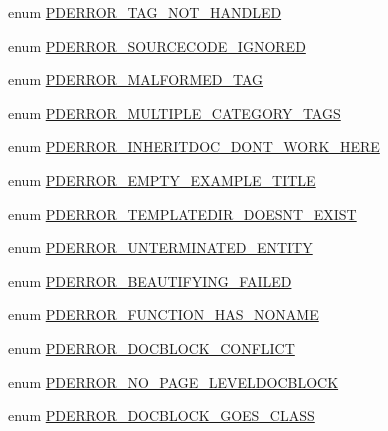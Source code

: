 \begin{DoxyCompactItemize}
enum \hyperlink{_errors_8inc_a3b7e6fcbb2eab91583bd30a67ca2931f}{\-P\-D\-E\-R\-R\-O\-R\-\_\-\-T\-A\-G\-\_\-\-N\-O\-T\-\_\-\-H\-A\-N\-D\-L\-E\-D} 
\item 
enum \hyperlink{_errors_8inc_abb488f51f018fe72379e3f6d28e18042}{\-P\-D\-E\-R\-R\-O\-R\-\_\-\-S\-O\-U\-R\-C\-E\-C\-O\-D\-E\-\_\-\-I\-G\-N\-O\-R\-E\-D} 
\item 
enum \hyperlink{_errors_8inc_a3c67c0681439a0421ce7b7a1a906c968}{\-P\-D\-E\-R\-R\-O\-R\-\_\-\-M\-A\-L\-F\-O\-R\-M\-E\-D\-\_\-\-T\-A\-G} 
\item 
enum \hyperlink{_errors_8inc_aabb34094599a840618a76d679885ed8f}{\-P\-D\-E\-R\-R\-O\-R\-\_\-\-M\-U\-L\-T\-I\-P\-L\-E\-\_\-\-C\-A\-T\-E\-G\-O\-R\-Y\-\_\-\-T\-A\-G\-S} 
\item 
enum \hyperlink{_errors_8inc_acc46229fbb1d0e6f217b4793f2e5982d}{\-P\-D\-E\-R\-R\-O\-R\-\_\-\-I\-N\-H\-E\-R\-I\-T\-D\-O\-C\-\_\-\-D\-O\-N\-T\-\_\-\-W\-O\-R\-K\-\_\-\-H\-E\-R\-E} 
\item 
enum \hyperlink{_errors_8inc_a18f0d64cdac99e18ba00e38f76f4975e}{\-P\-D\-E\-R\-R\-O\-R\-\_\-\-E\-M\-P\-T\-Y\-\_\-\-E\-X\-A\-M\-P\-L\-E\-\_\-\-T\-I\-T\-L\-E} 
\item 
enum \hyperlink{_errors_8inc_aa3ff15ba05df15070e53cddb0dd16285}{\-P\-D\-E\-R\-R\-O\-R\-\_\-\-T\-E\-M\-P\-L\-A\-T\-E\-D\-I\-R\-\_\-\-D\-O\-E\-S\-N\-T\-\_\-\-E\-X\-I\-S\-T} 
\item 
enum \hyperlink{_errors_8inc_ac1819edecbedcd7730959b8e0f501e00}{\-P\-D\-E\-R\-R\-O\-R\-\_\-\-U\-N\-T\-E\-R\-M\-I\-N\-A\-T\-E\-D\-\_\-\-E\-N\-T\-I\-T\-Y} 
\item 
enum \hyperlink{_errors_8inc_aacf0b9e2d6d73e79dbaa0189de75aa11}{\-P\-D\-E\-R\-R\-O\-R\-\_\-\-B\-E\-A\-U\-T\-I\-F\-Y\-I\-N\-G\-\_\-\-F\-A\-I\-L\-E\-D} 
\item 
enum \hyperlink{_errors_8inc_a27a928754d8422c41c5202ac2f06c3b9}{\-P\-D\-E\-R\-R\-O\-R\-\_\-\-F\-U\-N\-C\-T\-I\-O\-N\-\_\-\-H\-A\-S\-\_\-\-N\-O\-N\-A\-M\-E} 
\item 
enum \hyperlink{_errors_8inc_ae63fdc725da19a0cafb6f3533fe7888e}{\-P\-D\-E\-R\-R\-O\-R\-\_\-\-D\-O\-C\-B\-L\-O\-C\-K\-\_\-\-C\-O\-N\-F\-L\-I\-C\-T} 
\item 
enum \hyperlink{_errors_8inc_aeb5d73fb42937a01b7865a0dce172f8d}{\-P\-D\-E\-R\-R\-O\-R\-\_\-\-N\-O\-\_\-\-P\-A\-G\-E\-\_\-\-L\-E\-V\-E\-L\-D\-O\-C\-B\-L\-O\-C\-K} 
\item 
enum \hyperlink{_errors_8inc_ab7c9e11a7ed2f2514ba4271b644ffe73}{\-P\-D\-E\-R\-R\-O\-R\-\_\-\-D\-O\-C\-B\-L\-O\-C\-K\-\_\-\-G\-O\-E\-S\-\_\-\-C\-L\-A\-S\-S} 
\item 

\end{DoxyCompactItemize}
